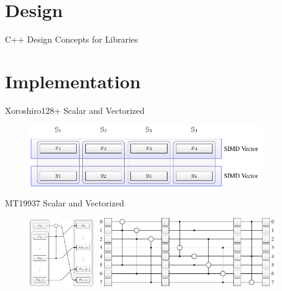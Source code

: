 \documentclass[aspectratio=169]{beamer}
\begin{document}
  \section{Design} %
  \label{sec:design}
    \begin{frame}{C++ Design Concepts for Libraries}

    \end{frame}

  \section{Implementation} %
  \label{sec:implementation}
    \begin{frame}{Xoroshiro128+ Scalar and Vectorized}
      \begin{figure}
        \includegraphics[width=0.9\textwidth]{figures/xrsr128p_vector_layout.pdf}
      \end{figure}
    \end{frame}

    \begin{frame}{MT19937 Scalar and Vectorized}
      \begin{figure}
        \includegraphics[width=0.25\textwidth]{figures/mt19937_transition_short.pdf}
        \includegraphics[width=0.7\textwidth]{figures/mt19937_loop_scheme.pdf}
      \end{figure}
    \end{frame}
\end{document}
